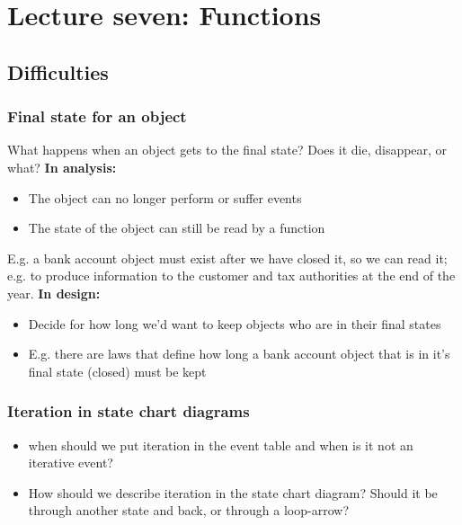 \chapter{Lecture seven: Functions}
\section{Difficulties}

\subsection{Final state for an object}
What happens when an object gets to the final state? Does it die, disappear, or what? \newline \textbf{In analysis:}

\begin{itemize}
    \item The object can no longer perform or suffer events
    \item The state of the object can still be read by a function
\end{itemize}

E.g. a bank account object must exist after we have closed it, so we can read it; e.g. to produce information to the customer and tax authorities at the end of the year. \newline \textbf{In design:}

\begin{itemize}
    \item Decide for how long we'd want to keep objects who are in their final states
    \item E.g. there are laws that define how long a bank account object that is in it's final state (closed) must be kept
\end{itemize}

\subsection{Iteration in state chart diagrams} 

\begin{itemize}
    \item when should we put iteration in the event table and when is it not an iterative event?
    \item How should we describe iteration in the state chart diagram? Should it be through another state and back, or through a loop-arrow?
\end{itemize}

